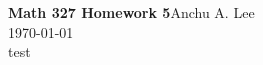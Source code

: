 \documentclass{article}
\begin{document}
    \noindent\textbf{Math 327 Homework 5}\hfill Anchu A. Lee\\
    \noindent\today\\
    test
\end{document}
